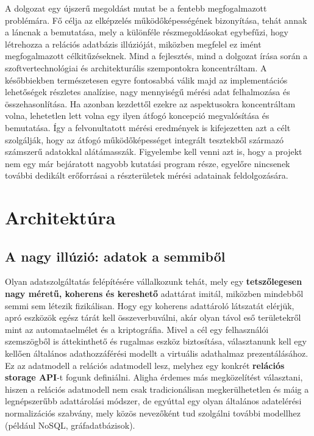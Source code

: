 \documentclass[
    parspace,
    noindent,
    nohyp,
]{elteiktdk}[2023/04/10]
\newcommand{\todoref}[1]{\todo[inline, noinlinepar, color=red, textcolor=white, inlinewidth=0.6cm, caption={#1}]{\large \textbf{×}}}
\begin{document}
A dolgozat egy újszerű megoldást mutat be a fentebb megfogalmazott problémára.
Fő célja az elképzelés működőképességének bizonyítása,
tehát annak a láncnak a bemutatása,
mely a különféle részmegoldásokat egybefűzi,
hogy létrehozza a relációs adatbázis illúzióját,
miközben megfelel ez imént megfogalmazott célkitűzéseknek.
Mind a fejlesztés, mind a dolgozat írása során
a szoftvertechnológiai és architekturális szempontokra koncentráltam.
A későbbiekben természetesen egyre fontosabbá válik majd az implementációs lehetőségek
részletes analízise, nagy mennyiségű mérési adat felhalmozása és összehasonlítása.
Ha azonban kezdettől ezekre az aspektusokra koncentráltam volna,
lehetetlen lett volna egy ilyen átfogó koncepció megvalósítása és bemutatása.
Így a felvonultatott mérési eredmények is kifejezetten azt a célt szolgálják,
hogy az átfogó működőképességet integrált tesztekből származó számszerű adatokkal alátámasszák.
Figyelembe kell venni azt is,
hogy a projekt nem egy már bejáratott nagyobb kutatási program része,
egyelőre nincsenek további dedikált erőforrásai
a részterületek mérési adatainak feldolgozására.
\todoref{+CITE: a dolgozat koncepciója: a mérések fényében ezen enyhíteni}


\chapter{Architektúra}

\section{A nagy illúzió: adatok a semmiből}

Olyan adatszolgáltatás felépítésére vállalkozunk tehát,
mely egy \textbf{tetszőlegesen nagy méretű, koherens és kereshető} adattárat imitál,
miközben mindebből semmi sem létezik fizikálisan.
Hogy egy koherens adattároló látszatát elérjük,
apró eszközök egész tárát kell összeverbuválni,
akár olyan távol eső területekről mint az automataelmélet és a kriptográfia.
Mivel a cél egy felhasználói szemszögből is áttekinthető és rugalmas eszköz biztosítása,
választanunk kell egy kellően általános adathozzáférési modellt a virtuális adathalmaz prezentálásához.
Ez az adatmodell a relációs adatmodell lesz,
melyhez egy konkrét \textbf{relációs storage API}-t fogunk definiálni.
Aligha érdemes más megközelítést választani,
hiszen a relációs adatmodell nem csak tradicionálisan megkerülhetetlen
és máig a legnépszerűbb adattárolási módszer\cite{DBEngines2024RankingModels},
de egyúttal egy olyan általános adatelérési normalizációs szabvány,
mely közös nevezőként tud szolgálni további modellhez (például NoSQL, gráfadatbázisok).
\end{document}
